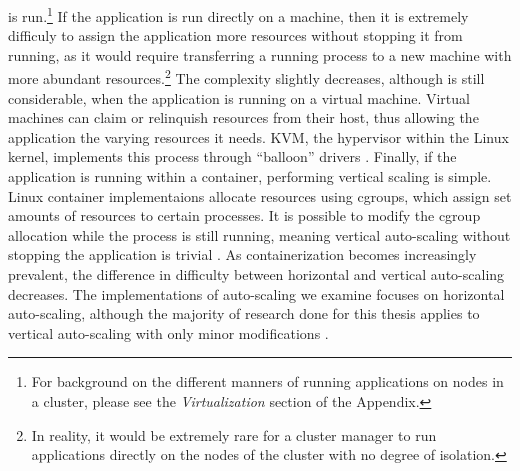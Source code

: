 \begin{enumerate}
    is run.\footnote{For background on the different manners of running
      applications on nodes in a cluster, please see the \textit{Virtualization}
    section of the Appendix.} If the application is run directly on a machine,
    then it is extremely difficuly to assign the application more resources
    without stopping it from running, as it would require transferring a running
    process to a new machine with more abundant resources.\footnote{In reality,
    it would be extremely rare for a cluster manager to run applications
  directly on the nodes of the cluster with no degree of isolation.} The complexity
    slightly decreases, although is still considerable, when the application is
    running on a virtual machine. Virtual machines can claim or relinquish
    resources from their host, thus allowing the application the varying
    resources it needs. KVM, the hypervisor within the Linux kernel, implements
    this process through ``balloon'' drivers \cite{kvm-automatic-ballooning}.
    Finally, if the application is running within a container, performing
    vertical scaling is simple. Linux container implementaions allocate
    resources using cgroups, which assign set amounts of resources to certain
    processes. It is possible to modify the cgroup allocation while the process
    is still running, meaning vertical auto-scaling without stopping the
    application is trivial \cite{docker-up-and-running-cgroups}.
    As containerization becomes increasingly prevalent, the difference in
    difficulty between horizontal and vertical auto-scaling decreases.
    The implementations of auto-scaling we examine focuses on horizontal
    auto-scaling, although the majority of research done for this thesis applies
    to vertical auto-scaling with only minor modifications
    \cite{auto-scaling-techniques-for-elastic-applications-in-cloud-environments}.


\end{enumerate}

